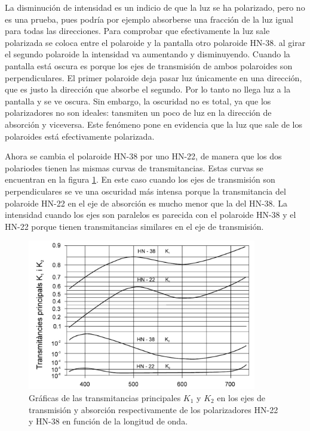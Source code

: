 \documentclass[12pt]{article}
\numberwithin{table}{section}
\numberwithin{figure}{section}
\numberwithin{equation}{section}
\begin{document}
La disminución de intensidad es un indicio de que la luz se ha polarizado, pero no es una prueba, pues podría por ejemplo absorberse una fracción de la luz igual para todas las direcciones. Para comprobar que efectivamente la luz sale polarizada se coloca entre el polaroide y la pantalla otro polaroide HN-38. al girar el segundo polaroide la intensidad va aumentando y disminuyendo. Cuando la pantalla está oscura es porque los ejes de transmisión de ambos polaroides son perpendiculares. El primer polaroide deja pasar luz únicamente en una dirección, que es justo la dirección que absorbe el segundo. Por lo tanto no llega luz a la pantalla y se ve oscura. Sin embargo, la oscuridad no es total, ya que los polarizadores no son ideales: tansmiten un poco de luz en la dirección de absorción y viceversa. Este fenómeno pone en evidencia que la luz que sale de los polaroides está efectivamente polarizada.

Ahora se cambia el polaroide HN-38 por uno HN-22, de manera que los dos polariodes tienen las mismas curvas de transmitancias. Estas curvas se encuentran en la figura \ref{P5transmitancias}. En este caso cuando los ejes de transmisión son perpendiculares se ve una oscuridad más intensa porque la transmitancia del polaroide HN-22 en el eje de absorción es mucho menor que la del HN-38. La intensidad cuando los ejes son paralelos es parecida con el polaroide HN-38 y el HN-22 porque tienen transmitancias similares en el eje de transmisión.

\begin{figure}[!ht]
\begin{center}
\includegraphics[width=10cm]{P5Transmitancias.pdf}
\caption{Gráficas de las transmitancias principales $K_1$ y $K_2$ en los ejes de transmisión y absorción respectivamente de los polarizadores HN-22 y HN-38 en función de la longitud de onda.}\label{P5transmitancias}
\end{center}
\end{figure}
\end{document}
